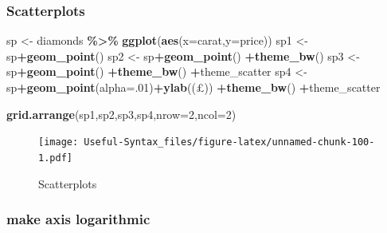 \documentclass[
]{article}
\newenvironment{Shaded}{\begin{snugshade}}{\end{snugshade}}
\newcommand{\AttributeTok}[1]{\textcolor[rgb]{0.13,0.29,0.53}{#1}}
\newcommand{\DecValTok}[1]{\textcolor[rgb]{0.00,0.00,0.81}{#1}}
\newcommand{\FunctionTok}[1]{\textcolor[rgb]{0.13,0.29,0.53}{\textbf{#1}}}
\newcommand{\NormalTok}[1]{#1}
\newcommand{\OtherTok}[1]{\textcolor[rgb]{0.56,0.35,0.01}{#1}}
\newcommand{\SpecialCharTok}[1]{\textcolor[rgb]{0.81,0.36,0.00}{\textbf{#1}}}
\newcommand{\StringTok}[1]{\textcolor[rgb]{0.31,0.60,0.02}{#1}}
\begin{document}
\hypertarget{scatterplots}{%
\subsubsection{Scatterplots}\label{scatterplots}}

\begin{Shaded}
\begin{Highlighting}[]
\NormalTok{sp }\OtherTok{\textless{}{-}}\NormalTok{ diamonds }\SpecialCharTok{\%\textgreater{}\%} \FunctionTok{ggplot}\NormalTok{(}\FunctionTok{aes}\NormalTok{(}\AttributeTok{x=}\NormalTok{carat,}\AttributeTok{y=}\NormalTok{price))}
\NormalTok{sp1 }\OtherTok{\textless{}{-}}\NormalTok{ sp}\SpecialCharTok{+}\FunctionTok{geom\_point}\NormalTok{()}
\NormalTok{sp2 }\OtherTok{\textless{}{-}}\NormalTok{ sp}\SpecialCharTok{+}\FunctionTok{geom\_point}\NormalTok{() }\SpecialCharTok{+}\FunctionTok{theme\_bw}\NormalTok{()}
\NormalTok{sp3 }\OtherTok{\textless{}{-}}\NormalTok{ sp}\SpecialCharTok{+}\FunctionTok{geom\_point}\NormalTok{() }\SpecialCharTok{+}\FunctionTok{theme\_bw}\NormalTok{() }\SpecialCharTok{+}\NormalTok{theme\_scatter}
\NormalTok{sp4 }\OtherTok{\textless{}{-}}\NormalTok{ sp}\SpecialCharTok{+}\FunctionTok{geom\_point}\NormalTok{(}\AttributeTok{alpha=}\NormalTok{.}\DecValTok{01}\NormalTok{)}\SpecialCharTok{+}\FunctionTok{ylab}\NormalTok{(}\StringTok{\textquotesingle{}(£)\textquotesingle{}}\NormalTok{) }\SpecialCharTok{+}\FunctionTok{theme\_bw}\NormalTok{() }\SpecialCharTok{+}\NormalTok{theme\_scatter}


\FunctionTok{grid.arrange}\NormalTok{(sp1,sp2,sp3,sp4,}\AttributeTok{nrow=}\DecValTok{2}\NormalTok{,}\AttributeTok{ncol=}\DecValTok{2}\NormalTok{)}
\end{Highlighting}
\end{Shaded}

\begin{figure}
\centering
\texttt{[image: Useful-Syntax\_files/figure-latex/unnamed-chunk-100-1.pdf]}
\caption{\label{fig:unnamed-chunk-100}Scatterplots}
\end{figure}

\hypertarget{make-axis-logarithmic}{%
\subsubsection{make axis logarithmic}\label{make-axis-logarithmic}}
\end{document}
